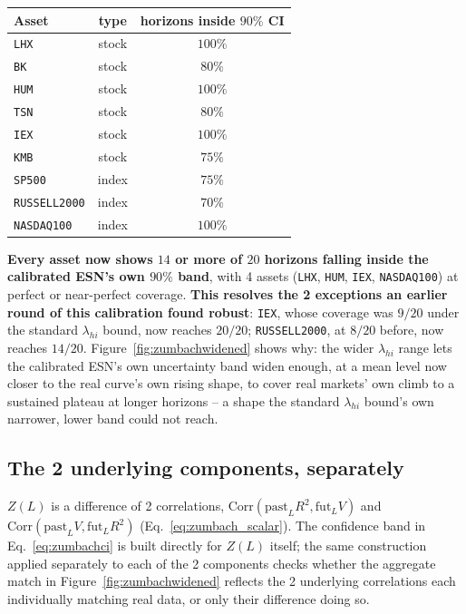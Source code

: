 \documentclass[11pt]{article}
\begin{document}
\begin{center}
\begin{tabular}{lcc}
\toprule
Asset & type & horizons inside $90\%$ CI \\
\midrule
\texttt{LHX}         & stock & $100\%$ \\
\texttt{BK}          & stock & $80\%$  \\
\texttt{HUM}         & stock & $100\%$ \\
\texttt{TSN}         & stock & $80\%$  \\
\texttt{IEX}         & stock & $100\%$ \\
\texttt{KMB}         & stock & $75\%$  \\
\texttt{SP500}       & index & $75\%$  \\
\texttt{RUSSELL2000} & index & $70\%$  \\
\texttt{NASDAQ100}   & index & $100\%$ \\
\bottomrule
\end{tabular}
\end{center}

\textbf{Every asset now shows $14$ or more of $20$ horizons falling inside
the calibrated ESN's own $90\%$ band}, with 4 assets (\texttt{LHX},
\texttt{HUM}, \texttt{IEX}, \texttt{NASDAQ100}) at perfect or
near-perfect coverage. \textbf{This resolves the 2 exceptions an earlier
round of this calibration found robust}: \texttt{IEX}, whose coverage was
$9/20$ under the standard $\lambda_{hi}$ bound, now reaches $20/20$;
\texttt{RUSSELL2000}, at $8/20$ before, now reaches $14/20$.
Figure~\ref{fig:zumbachwidened} shows why: the wider $\lambda_{hi}$ range
lets the calibrated ESN's own uncertainty band widen enough, at a mean level
now closer to the real curve's own rising shape, to cover real markets'
own climb to a sustained plateau at longer horizons -- a shape the standard
$\lambda_{hi}$ bound's own narrower, lower band could not reach.

\subsection{The 2 underlying components, separately}
\label{sec:components}
$Z(L)$ is a difference of 2 correlations,
$\text{Corr}(\text{past}_LR^2,\text{fut}_LV)$ and
$\text{Corr}(\text{past}_LV,\text{fut}_LR^2)$ (Eq.~\ref{eq:zumbach_scalar}).
The confidence band in Eq.~\ref{eq:zumbachci} is built directly for
$Z(L)$ itself; the same construction applied separately to each of the 2
components checks whether the aggregate match in
Figure~\ref{fig:zumbachwidened} reflects the 2 underlying correlations each
individually matching real data, or only their difference doing so.
\end{document}
